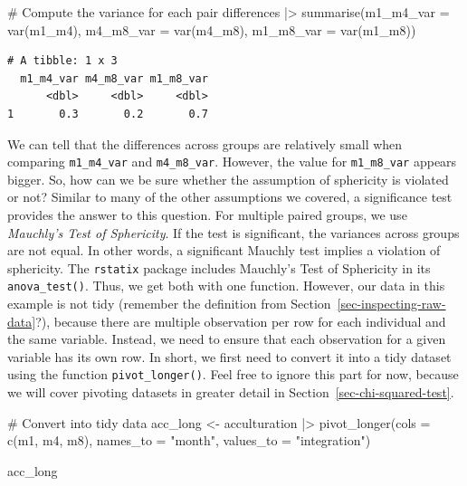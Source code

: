 \documentclass[
  letterpaper,
  DIV=11,
  numbers=noendperiod]{scrreprt}
\newenvironment{Shaded}{\begin{snugshade}}{\end{snugshade}}
\newcommand{\AttributeTok}[1]{\textcolor[rgb]{0.40,0.45,0.13}{#1}}
\newcommand{\CommentTok}[1]{\textcolor[rgb]{0.37,0.37,0.37}{#1}}
\newcommand{\FunctionTok}[1]{\textcolor[rgb]{0.28,0.35,0.67}{#1}}
\newcommand{\NormalTok}[1]{\textcolor[rgb]{0.00,0.23,0.31}{#1}}
\newcommand{\OtherTok}[1]{\textcolor[rgb]{0.00,0.23,0.31}{#1}}
\newcommand{\SpecialCharTok}[1]{\textcolor[rgb]{0.37,0.37,0.37}{#1}}
\newcommand{\StringTok}[1]{\textcolor[rgb]{0.13,0.47,0.30}{#1}}
\begin{document}
\begin{Shaded}
\begin{Highlighting}[]
\CommentTok{\# Compute the variance for each pair}
\NormalTok{differences }\SpecialCharTok{|\textgreater{}}
  \FunctionTok{summarise}\NormalTok{(}\AttributeTok{m1\_m4\_var =} \FunctionTok{var}\NormalTok{(m1\_m4),}
            \AttributeTok{m4\_m8\_var =} \FunctionTok{var}\NormalTok{(m4\_m8),}
            \AttributeTok{m1\_m8\_var =} \FunctionTok{var}\NormalTok{(m1\_m8))}
\end{Highlighting}
\end{Shaded}

\begin{verbatim}
# A tibble: 1 x 3
  m1_m4_var m4_m8_var m1_m8_var
      <dbl>     <dbl>     <dbl>
1       0.3       0.2       0.7
\end{verbatim}

We can tell that the differences across groups are relatively small when
comparing \texttt{m1\_m4\_var} and \texttt{m4\_m8\_var}. However, the
value for \texttt{m1\_m8\_var} appears bigger. So, how can we be sure
whether the assumption of sphericity is violated or not? Similar to many
of the other assumptions we covered, a significance test provides the
answer to this question. For multiple paired groups, we use
\emph{Mauchly's Test of Sphericity}. If the test is significant, the
variances across groups are not equal. In other words, a significant
Mauchly test implies a violation of sphericity. The \texttt{rstatix}
package includes Mauchly's Test of Sphericity in its
\texttt{anova\_test()}. Thus, we get both with one function. However,
our data in this example is not tidy (remember the definition from
Section~\ref{sec-inspecting-raw-data}?), because there are multiple
observation per row for each individual and the same variable. Instead,
we need to ensure that each observation for a given variable has its own
row. In short, we first need to convert it into a tidy dataset using the
function \texttt{pivot\_longer()}. Feel free to ignore this part for
now, because we will cover pivoting datasets in greater detail in
Section~\ref{sec-chi-squared-test}.

\begin{Shaded}
\begin{Highlighting}[]
\CommentTok{\# Convert into tidy data}
\NormalTok{acc\_long }\OtherTok{\textless{}{-}}
\NormalTok{  acculturation }\SpecialCharTok{|\textgreater{}}
  \FunctionTok{pivot\_longer}\NormalTok{(}\AttributeTok{cols =} \FunctionTok{c}\NormalTok{(m1, m4, m8),}
               \AttributeTok{names\_to =} \StringTok{"month"}\NormalTok{,}
               \AttributeTok{values\_to =} \StringTok{"integration"}\NormalTok{)}

\NormalTok{acc\_long}
\end{Highlighting}
\end{Shaded}
\end{document}
